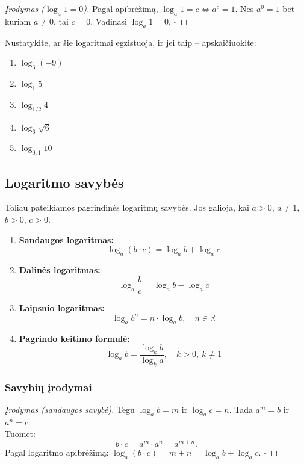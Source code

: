 \begin{proof}[Įrodymas ($\log_a 1 = 0$)]
Pagal apibrėžimą, $\log_a 1 = c \iff a^c = 1$. Nes $a^0 = 1$ bet kuriam $a \neq 0$, tai $c = 0$. Vadinasi $\log_a 1 = 0$. $\square$
\end{proof}

\begin{exercise}
Nustatykite, ar šie logaritmai egzistuoja, ir jei taip – apskaičiuokite:
\begin{enumerate}[label=\arabic*.]
    \item $\log_3 (-9)$
    \item $\log_1 5$
    \item $\log_{1/2} 4$
    \item $\log_6 \sqrt{6}$
    \item $\log_{0{,}1} 10$
\end{enumerate}
\end{exercise}

\subsection{Logaritmo savybės}

Toliau pateikiamos pagrindinės logaritmų savybės. Jos galioja, kai $a > 0$, $a \neq 1$, $b > 0$, $c > 0$.

\begin{tcolorbox}[title=Pagrindinės logaritmų savybės]
\begin{enumerate}[label=\textbf{\arabic*.}]
    \item \textbf{Sandaugos logaritmas:}
    \[
    \log_a (b \cdot c) = \log_a b + \log_a c
    \]
    \item \textbf{Dalinės logaritmas:}
    \[
    \log_a \frac{b}{c} = \log_a b - \log_a c
    \]
    \item \textbf{Laipsnio logaritmas:}
    \[
    \log_a b^n = n \cdot \log_a b, \quad n \in \mathbb{R}
    \]
    \item \textbf{Pagrindo keitimo formulė:}
    \[
    \log_a b = \frac{\log_k b}{\log_k a}, \quad k > 0,\ k \neq 1
    \]
\end{enumerate}
\end{tcolorbox}

\subsubsection*{Savybių įrodymai}

\begin{proof}[Įrodymas (sandaugos savybė)]
Tegu $\log_a b = m$ ir $\log_a c = n$. Tada $a^m = b$ ir $a^n = c$.\\
Tuomet:
\[
b \cdot c = a^m \cdot a^n = a^{m+n}.
\]
Pagal logaritmo apibrėžimą: $\log_a(b \cdot c) = m + n = \log_a b + \log_a c$. $\square$
\end{proof}

